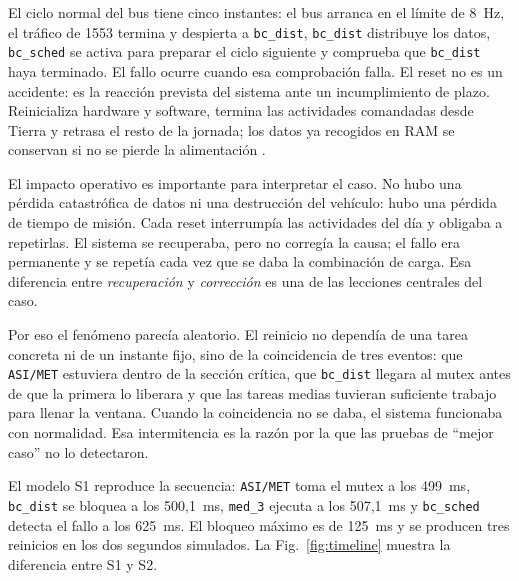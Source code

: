 \documentclass[journal]{IEEEtran}
\begin{document}
El ciclo normal del bus tiene cinco instantes: el bus arranca en el límite de 8~Hz, el tráfico de 1553 termina y despierta a \texttt{bc\_dist}, \texttt{bc\_dist} distribuye los datos, \texttt{bc\_sched} se activa para preparar el ciclo siguiente y comprueba que \texttt{bc\_dist} haya terminado. El fallo ocurre cuando esa comprobación falla. El reset no es un accidente: es la reacción prevista del sistema ante un incumplimiento de plazo. Reinicializa hardware y software, termina las actividades comandadas desde Tierra y retrasa el resto de la jornada; los datos ya recogidos en RAM se conservan si no se pierde la alimentación \cite{reeves1997mars}.

El impacto operativo es importante para interpretar el caso. No hubo una pérdida catastrófica de datos ni una destrucción del vehículo: hubo una pérdida de tiempo de misión. Cada reset interrumpía las actividades del día y obligaba a repetirlas. El sistema se recuperaba, pero no corregía la causa; el fallo era permanente y se repetía cada vez que se daba la combinación de carga. Esa diferencia entre \emph{recuperación} y \emph{corrección} es una de las lecciones centrales del caso.

Por eso el fenómeno parecía aleatorio. El reinicio no dependía de una tarea concreta ni de un instante fijo, sino de la coincidencia de tres eventos: que \texttt{ASI/MET} estuviera dentro de la sección crítica, que \texttt{bc\_dist} llegara al mutex antes de que la primera lo liberara y que las tareas medias tuvieran suficiente trabajo para llenar la ventana. Cuando la coincidencia no se daba, el sistema funcionaba con normalidad. Esa intermitencia es la razón por la que las pruebas de ``mejor caso'' no lo detectaron.

El modelo S1 reproduce la secuencia: \texttt{ASI/MET} toma el mutex a los 499~ms, \texttt{bc\_dist} se bloquea a los 500,1~ms, \texttt{med\_3} ejecuta a los 507,1~ms y \texttt{bc\_sched} detecta el fallo a los 625~ms. El bloqueo máximo es de 125~ms y se producen tres reinicios en los dos segundos simulados. La Fig.~\ref{fig:timeline} muestra la diferencia entre S1 y S2.
\end{document}
